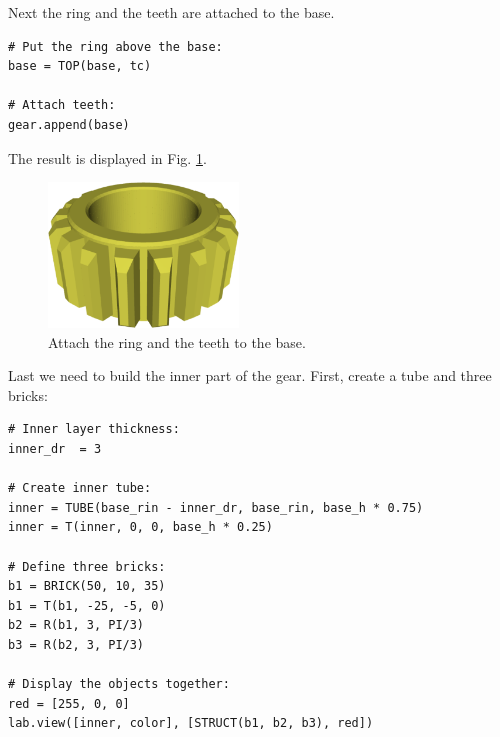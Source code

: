 \noindent
Next the ring and the teeth are attached to the base.\\

{\small
\begin{bbox}
\begin{verbatim}
# Put the ring above the base:
base = TOP(base, tc)

# Attach teeth:
gear.append(base) 
\end{verbatim}
\end{bbox}
}
\vspace{6mm}

\noindent
The result is displayed in Fig. \ref{fig:gear-7}.

\begin{figure}[!ht]
\begin{center}
\includegraphics[width=0.45\textwidth]{img/gear-7.png}
\end{center}
\vspace{-4mm}
\caption{Attach the ring and the teeth to the base.}
\label{fig:gear-7}
\end{figure}
\noindent
Last we need to build the inner part of the gear. 
First, create a tube and three bricks:\\

{\small
\begin{bbox}
\begin{verbatim}
# Inner layer thickness:
inner_dr  = 3

# Create inner tube:
inner = TUBE(base_rin - inner_dr, base_rin, base_h * 0.75)
inner = T(inner, 0, 0, base_h * 0.25)

# Define three bricks:
b1 = BRICK(50, 10, 35)
b1 = T(b1, -25, -5, 0)
b2 = R(b1, 3, PI/3)
b3 = R(b2, 3, PI/3)

# Display the objects together:
red = [255, 0, 0]
lab.view([inner, color], [STRUCT(b1, b2, b3), red])
\end{verbatim}
\end{bbox}
}
\vspace{6mm}

